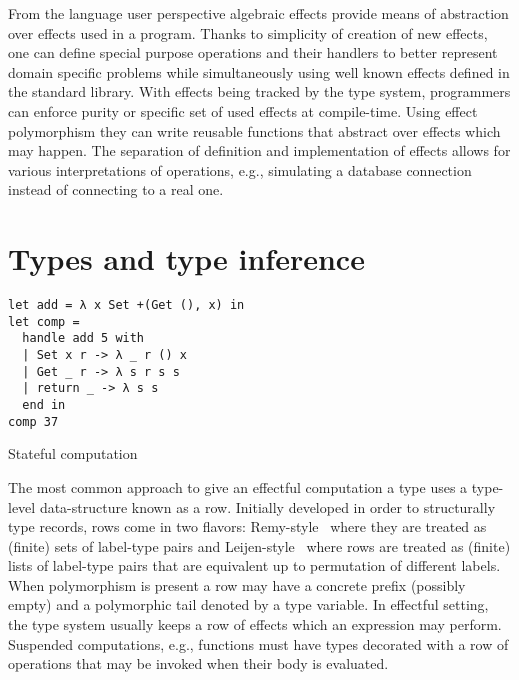 \documentclass[inz, english, longabstract]{iithesis}
\begin{document}
From the language user perspective algebraic effects provide means of abstraction over effects used in a program.
Thanks to simplicity of creation of new effects, one can define special purpose operations and their handlers to better represent domain specific problems while simultaneously using well known effects defined in the standard library.
With effects being tracked by the type system, programmers can enforce purity or specific set of used effects at compile-time.
Using effect polymorphism they can write reusable functions that abstract over effects which may happen.
The separation of definition and implementation of effects allows for various interpretations of operations, e.g., simulating a database connection instead of connecting to a real one.

\section{Types and type inference}\label{sec:types}
\begin{listing}[t]
  \begin{Verbatim}
let add = λ x Set +(Get (), x) in
let comp = 
  handle add 5 with
  | Set x r -> λ _ r () x
  | Get _ r -> λ s r s s
  | return _ -> λ s s
  end in
comp 37
  \end{Verbatim}
  \caption{Stateful computation}
  \label{lst:stateful-computation}
\end{listing}
The most common approach to give an effectful computation a type uses a type-level data-structure known as a row.
Initially developed in order to structurally type records, rows come in two flavors: Remy-style~\cite{Remy1994} where they are treated as (finite) sets of label-type pairs and Leijen-style~\cite{Leijen2005} where rows are treated as (finite) lists of label-type pairs that are equivalent up to permutation of different labels.
When polymorphism is present a row may have a concrete prefix (possibly empty) and a polymorphic tail denoted by a type variable.
In effectful setting, the type system usually keeps a row of effects which an expression may perform.
Suspended computations, e.g., functions must have types decorated with a row of operations that may be invoked when their body is evaluated.
\end{document}
